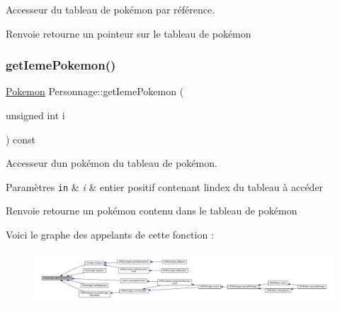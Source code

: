 Accesseur du tableau de pokémon par référence. 

\begin{DoxyReturn}{Renvoie}
retourne un pointeur sur le tableau de pokémon 
\end{DoxyReturn}
\mbox{\label{class_personnage_abd45dd4e1a4099a6300c037fc41e1037}} 
\subsubsection{\texorpdfstring{get\+Ieme\+Pokemon()}{getIemePokemon()}}
{\footnotesize\ttfamily \hyperlink{class_pokemon}{Pokemon} Personnage\+::get\+Ieme\+Pokemon (\begin{DoxyParamCaption}\item[{unsigned int}]{i }\end{DoxyParamCaption}) const}



Accesseur d\textquotesingle{}un pokémon du tableau de pokémon. 


\begin{DoxyParams}[1]{Paramètres}
\mbox{\tt in}  & {\em i} & entier positif contenant l\textquotesingle{}index du tableau à accéder \\
\hline
\end{DoxyParams}
\begin{DoxyReturn}{Renvoie}
retourne un pokémon contenu dans le tableau de pokémon 
\end{DoxyReturn}
Voici le graphe des appelants de cette fonction \+:\nopagebreak
\begin{figure}[H]
\begin{center}
\leavevmode
\includegraphics[width=350pt]{class_personnage_abd45dd4e1a4099a6300c037fc41e1037_icgraph}
\end{center}
\end{figure}
\mbox{\label{class_personnage_aeab0448ba1e833d57ee17827e3a6ac0d}} 
